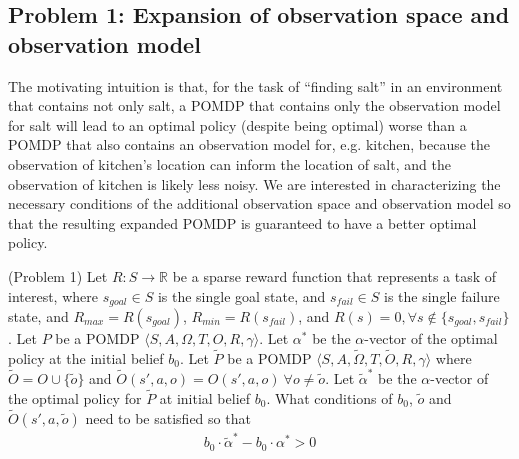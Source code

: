 \documentclass{article}
\newcommand{\td}[1]{\tilde{#1}}
\begin{document}
\subsection{Problem 1: Expansion of observation space and observation model}

The motivating intuition is that, for the task of ``finding salt'' in an environment that contains not only salt, a POMDP that contains only the observation model for salt will lead to an optimal policy (despite being optimal) worse than a POMDP that also contains an observation model for, e.g. kitchen, because the observation of kitchen's location can inform the location of salt, and the observation of kitchen is likely less noisy. We are interested in characterizing the necessary conditions of the additional observation space and observation model so that the resulting expanded POMDP is guaranteed to have a better optimal policy.

\begin{definition}(Problem 1)
Let $R:S\rightarrow \mathbb{R}$ be a sparse reward function that represents a task of interest, where $s_{goal}\in S$ is the single goal state, and $s_{fail}\in S$ is the single failure state, and $R_{max}=R(s_{goal})$, $R_{min}=R(s_{fail})$, and $R(s)=0, \forall s \not\in\{s_{goal},s_{fail}\}$. Let $P$ be a POMDP $\langle S, A, \Omega, T, O, R, \gamma  \rangle$. Let $\alpha^*$ be the $\alpha$-vector of the optimal policy at the initial belief $b_0$. Let $\td{P}$ be a POMDP $\langle S, A, \td{\Omega}, T, \td{O}, R, \gamma  \rangle$ where $\td{O}=O\cup\{\td{o}\}$ and $\td{O}(s',a,o)=O(s',a,o)\ \forall o\neq \td{o}$. Let $\td{\alpha}^*$ be the $\alpha$-vector of the optimal policy for $\td{P}$ at initial belief $b_0$. What conditions of $b_0$, $\td{o}$ and $\td{O}(s',a,\td{o})$ need to be satisfied so that
\begin{align}
b_0\cdot \td{\alpha}^* - b_0\cdot \alpha^* > 0
\end{align}
\end{definition}












\end{document}
